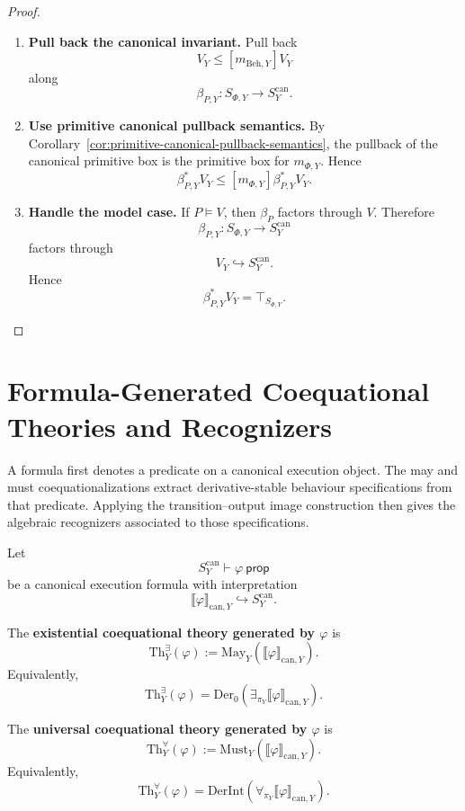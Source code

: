 \begin{proof}
\leavevmode
\begin{enumerate}
  \item \textbf{Pull back the canonical invariant.}
  Pull back
  \[
    V_Y\leq [m_{\mathrm{Beh},Y}]V_Y
  \]
  along
  \[
    \beta_{P,Y}:S_{\Phi,Y}\to S^{\mathrm{can}}_Y.
  \]

  \item \textbf{Use primitive canonical pullback semantics.}
  By Corollary~\ref{cor:primitive-canonical-pullback-semantics}, the
  pullback of the canonical primitive box is the primitive box for
  \(m_{\Phi,Y}\).  Hence
  \[
    \beta_{P,Y}^*V_Y
    \leq
    [m_{\Phi,Y}]\beta_{P,Y}^*V_Y.
  \]

  \item \textbf{Handle the model case.}
  If \(P\models V\), then \(\beta_P\) factors through \(V\).  Therefore
  \[
    \beta_{P,Y}:S_{\Phi,Y}\to S^{\mathrm{can}}_Y
  \]
  factors through
  \[
    V_Y\hookrightarrow S^{\mathrm{can}}_Y.
  \]
  Hence
  \[
    \beta_{P,Y}^*V_Y
    =
    \top_{S_{\Phi,Y}}.
  \]
\end{enumerate}
\end{proof}

\section{Formula-Generated Coequational Theories and Recognizers}
\label{sec:formula-generated-theories-and-recognizers}

A formula first denotes a predicate on a canonical execution object.  The may
and must coequationalizations extract derivative-stable behaviour
specifications from that predicate.  Applying the transition--output image
construction then gives the algebraic recognizers associated to those
specifications.

Let
\[
  S^{\mathrm{can}}_Y\vdash \varphi\ \mathsf{prop}
\]
be a canonical execution formula with interpretation
\[
  \llbracket\varphi\rrbracket_{\mathrm{can},Y}
  \hookrightarrow
  S^{\mathrm{can}}_Y.
\]

\begin{definition}
\label{def:formula-generated-coequational-theories}
The \textbf{existential coequational theory generated by \(\varphi\)} is
\[
  \mathrm{Th}^{\exists}_Y(\varphi)
  :=
  \mathrm{May}_Y
  \left(
    \llbracket\varphi\rrbracket_{\mathrm{can},Y}
  \right).
\]
Equivalently,
\[
  \mathrm{Th}^{\exists}_Y(\varphi)
  =
  \mathrm{Der}_0
  \left(
    \exists_{\pi_Y}
    \llbracket\varphi\rrbracket_{\mathrm{can},Y}
  \right).
\]

The \textbf{universal coequational theory generated by \(\varphi\)} is
\[
  \mathrm{Th}^{\forall}_Y(\varphi)
  :=
  \mathrm{Must}_Y
  \left(
    \llbracket\varphi\rrbracket_{\mathrm{can},Y}
  \right).
\]
Equivalently,
\[
  \mathrm{Th}^{\forall}_Y(\varphi)
  =
  \mathrm{DerInt}
  \left(
    \forall_{\pi_Y}
    \llbracket\varphi\rrbracket_{\mathrm{can},Y}
  \right).
\]
\end{definition}

